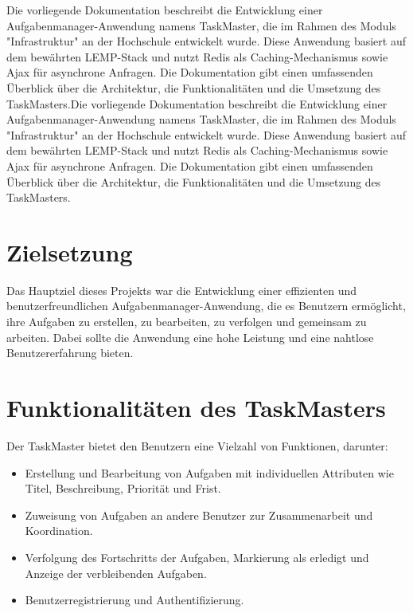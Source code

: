 Die vorliegende Dokumentation beschreibt die Entwicklung einer Aufgabenmanager-Anwendung namens TaskMaster, die im Rahmen des Moduls "Infrastruktur" an der Hochschule entwickelt wurde. Diese Anwendung basiert auf dem bewährten LEMP-Stack und nutzt Redis als Caching-Mechanismus sowie Ajax für asynchrone Anfragen. Die Dokumentation gibt einen umfassenden Überblick über die Architektur, die Funktionalitäten und die Umsetzung des TaskMasters.Die vorliegende Dokumentation beschreibt die Entwicklung einer Aufgabenmanager-Anwendung namens TaskMaster, die im Rahmen des Moduls "Infrastruktur" an der Hochschule entwickelt wurde. Diese Anwendung basiert auf dem bewährten LEMP-Stack und nutzt Redis als Caching-Mechanismus sowie Ajax für asynchrone Anfragen. Die Dokumentation gibt einen umfassenden Überblick über die Architektur, die Funktionalitäten und die Umsetzung des TaskMasters.

\section{Zielsetzung}

Das Hauptziel dieses Projekts war die Entwicklung einer effizienten und benutzerfreundlichen Aufgabenmanager-Anwendung, die es Benutzern ermöglicht, ihre Aufgaben zu erstellen, zu bearbeiten, zu verfolgen und gemeinsam zu arbeiten. Dabei sollte die Anwendung eine hohe Leistung und eine nahtlose Benutzererfahrung bieten.

\section{Funktionalitäten des TaskMasters}

Der TaskMaster bietet den Benutzern eine Vielzahl von Funktionen, darunter:

\begin{itemize}
    \item Erstellung und Bearbeitung von Aufgaben mit individuellen Attributen wie Titel, Beschreibung, Priorität und Frist.
    \item Zuweisung von Aufgaben an andere Benutzer zur Zusammenarbeit und Koordination.
    \item Verfolgung des Fortschritts der Aufgaben, Markierung als erledigt und Anzeige der verbleibenden Aufgaben.
    \item Benutzerregistrierung und Authentifizierung.
\end{itemize}



